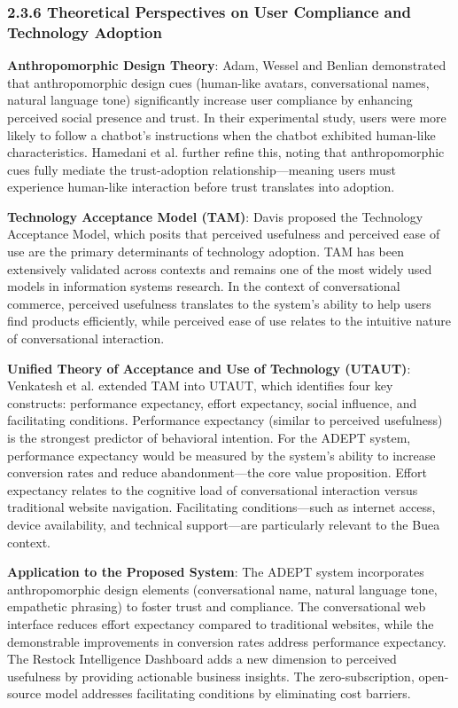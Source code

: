 \documentclass[12pt,a4paper]{article}
\begin{document}
\subsubsection{2.3.6 Theoretical Perspectives on User Compliance and Technology Adoption}

\textbf{Anthropomorphic Design Theory}: Adam, Wessel and Benlian \citep{adam2021} demonstrated that anthropomorphic design cues (human-like avatars, conversational names, natural language tone) significantly increase user compliance by enhancing perceived social presence and trust. In their experimental study, users were more likely to follow a chatbot's instructions when the chatbot exhibited human-like characteristics. Hamedani et al. \citep{hamedani2026} further refine this, noting that anthropomorphic cues fully mediate the trust-adoption relationship---meaning users must experience human-like interaction before trust translates into adoption.

\textbf{Technology Acceptance Model (TAM)}: Davis \citep{davis1989} proposed the Technology Acceptance Model, which posits that perceived usefulness and perceived ease of use are the primary determinants of technology adoption. TAM has been extensively validated across contexts and remains one of the most widely used models in information systems research. In the context of conversational commerce, perceived usefulness translates to the system's ability to help users find products efficiently, while perceived ease of use relates to the intuitive nature of conversational interaction.

\textbf{Unified Theory of Acceptance and Use of Technology (UTAUT)}: Venkatesh et al. \citep{venkatesh2003} extended TAM into UTAUT, which identifies four key constructs: performance expectancy, effort expectancy, social influence, and facilitating conditions. Performance expectancy (similar to perceived usefulness) is the strongest predictor of behavioral intention. For the ADEPT system, performance expectancy would be measured by the system's ability to increase conversion rates and reduce abandonment---the core value proposition. Effort expectancy relates to the cognitive load of conversational interaction versus traditional website navigation. Facilitating conditions---such as internet access, device availability, and technical support---are particularly relevant to the Buea context.

\textbf{Application to the Proposed System}: The ADEPT system incorporates anthropomorphic design elements (conversational name, natural language tone, empathetic phrasing) to foster trust and compliance. The conversational web interface reduces effort expectancy compared to traditional websites, while the demonstrable improvements in conversion rates address performance expectancy. The Restock Intelligence Dashboard adds a new dimension to perceived usefulness by providing actionable business insights. The zero-subscription, open-source model addresses facilitating conditions by eliminating cost barriers.
\end{document}
